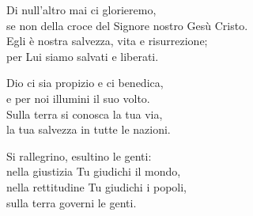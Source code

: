 

\spazio

\strofa Di null'altro mai ci glorieremo,\\
se non della croce del Signore nostro Gesù Cristo.\\
Egli è nostra salvezza, vita e risurrezione;\\
per Lui siamo salvati e liberati.

\spazio


\spazio

\strofa Dio ci sia propizio e ci benedica,\\
e per noi illumini il suo volto.\\
Sulla terra si conosca la tua via,\\
la tua salvezza in tutte le nazioni.

\spazio


\spazio

\strofa Si rallegrino, esultino le genti:\\
nella giustizia Tu giudichi il mondo,\\
nella rettitudine Tu giudichi i popoli,\\
sulla terra governi le genti.

\spazio

